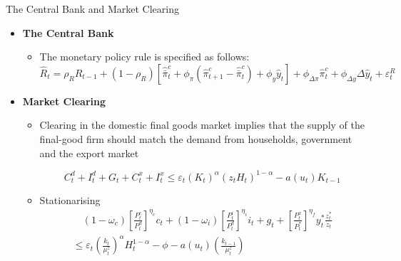 \documentclass[9pt]{beamer}
\begin{document}
\begin{frame}{The Central Bank and Market Clearing}
\begin{itemize}
    \item \textbf{The Central Bank}
    \label{frame6}
    \begin{itemize}
     \item The monetary policy rule is specified as follows:
        $$\hat{R}_{t}=\rho_{R} \hat{R}_{t-1}+\left(1-\rho_{R}\right)\left[\hat{\bar{\pi}}_{t}^{c}+\phi_{\pi}\left(\hat{\pi}_{t+1}^{c}-\hat{\bar{\pi}}_{t}^{c}\right)+\phi_{y} \hat{y}_{t}\right]+\phi_{\Delta \pi} \hat{\pi}_{t}^{c}+\phi_{\Delta y} \Delta \hat{y}_{t}+\varepsilon_{t}^{R} $$
    \end{itemize}
    \hyperlink{DomUnit6}{}
        
        \item \textbf{Market Clearing}
    
    \begin{itemize}
        \item Clearing in the domestic final goods market implies that the supply of the final-good firm should match the demand from households, government and the export market
        
        $$C_{t}^{d}+I_{t}^{d}+G_{t}+C_{t}^{x}+I_{t}^{x} \leq \varepsilon_{t}\left(K_{t}\right)^{\alpha}\left(z_{t} H_{t}\right)^{1-\alpha}-a\left(u_{t}\right) K_{t-1}$$
        
        \item Stationarising
        $$\begin{array}{l}
\quad\left(1-\omega_{c}\right)\left[\frac{P_{t}^{c}}{P_{t}^{d}}\right]^{\eta_{c}} c_{t}+\left(1-\omega_{i}\right)\left[\frac{P_{t}^{i}}{P_{t}^{d}}\right]^{\eta_{i}} i_{t}+g_{t}+\left[\frac{P_{t}^{x}}{P_{t}^{*}}\right]^{\eta_{f}} y_{t}^{*} \frac{z_{t}^{*}}{z_{t}} \\
\leq \varepsilon_{t}\left(\frac{k_{t}}{\mu_{t}^{z}}\right)^{\alpha} H_{t}^{1-\alpha}-\phi-a\left(u_{t}\right)\left(\frac{k_{t-1}}{\mu_{t}^{z}}\right)
\end{array}$$
        
    \end{itemize}
    
    
\end{itemize}

\end{frame}
    
\end{document}
